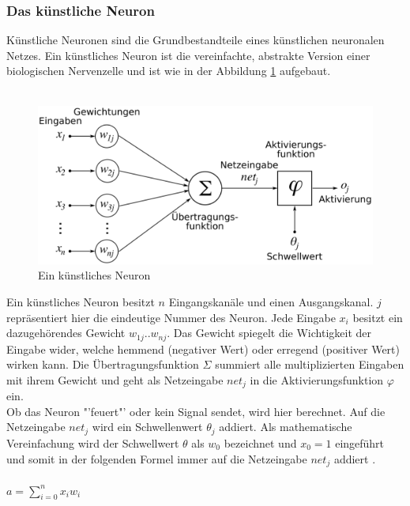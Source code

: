 \documentclass[12pt,oneside,a4paper,parskip]{scrbook}
\begin{document}
\subsubsection{Das künstliche Neuron}
Künstliche Neuronen sind die Grundbestandteile eines künstlichen neuronalen Netzes.
Ein künstliches Neuron ist die vereinfachte, abstrakte Version einer biologischen Nervenzelle und ist wie in der Abbildung \ref{fig:wikiNeuron} aufgebaut.\\\\
\begin{figure}[h]
	\begin{center}
		\includegraphics[width=12cm]{Bilder/ArtificialNeuronModel_deutsch.png}
		\caption{Ein künstliches Neuron\cite{wikiNN}}
		\label{fig:wikiNeuron}
	\end{center}
\end{figure}
Ein künstliches Neuron besitzt $n$ Eingangskanäle und einen Ausgangskanal. $j$ repräsentiert hier die eindeutige Nummer des Neuron. Jede Eingabe $x_{i}$ besitzt ein dazugehörendes Gewicht $w_{1j}..w_{nj}$. Das Gewicht spiegelt die Wichtigkeit der Eingabe wider, welche hemmend (negativer Wert) oder erregend (positiver Wert) wirken kann. Die Übertragungsfunktion $\Sigma$ summiert alle multiplizierten Eingaben mit ihrem Gewicht und geht als Netzeingabe $net_j$ in die Aktivierungsfunktion $\varphi$ ein. \\
Ob das Neuron "'feuert"' oder kein Signal sendet, wird hier berechnet. Auf die Netzeingabe $net_j$ wird ein Schwellenwert $\theta_j$ addiert. Als mathematische Vereinfachung wird der Schwellwert $\theta$ als $w_0$ bezeichnet und $x_0 = 1$ eingeführt und somit in der folgenden Formel immer auf die Netzeingabe $net_j$ addiert \cite{wikiNN}.
\\\\
${\displaystyle a=\sum _{i=0}^{n}x_{i}w_{i}}$
\\\\
\end{document}
